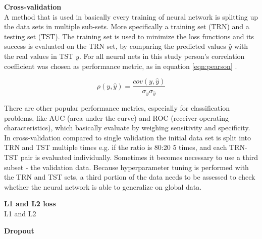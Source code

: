 \textbf{Cross-validation} \\

A method that is used in basically every training of neural network is splitting up the data sets in multiple sub-sets.
More specifically a training set (TRN) and a testing set (TST). The training set is used to minimize the loss functions
and its success is evaluated on the TRN set, by comparing the predicted values $\hat{y}$ with the real values in TST
$y$.  For all neural nets in this study person's correlation coefficient was chosen as performance metric, as in
equation \ref{eqn:pearson} \cite{soper1917distribution}.

\begin{equation}
\rho(y,\hat{y})  =  \frac{cov(y,\hat{y})}{  \sigma_y \sigma_{\hat{y}}}
  \label{eqn:pearson}
\end{equation}

There are other popular performance metrics, especially for classification problems, like AUC (area under the curve) and
ROC (receiver operating characteristics), which basically evaluate by weighing sensitivity and specificity.  In
cross-validation compared to single validation the initial data set is split into TRN and TST multiple times e.g. if the
ratio is 80:20 5 times, and each TRN-TST pair is evaluated individually. Sometimes it becomes necessary to use a third
subset - the validation data. Because hyperparameter tuning is performed with the TRN and TST sets, a third portion of
the data needs to be assessed to check whether the neural network is able to generalize on global data.

\textbf{L1 and L2 loss} \\
 
L1 and L2


\textbf{Dropout}


